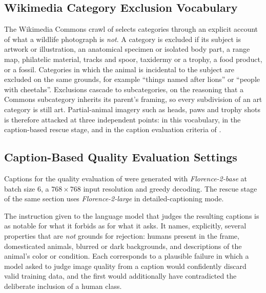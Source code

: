 \subsection{Wikimedia Category Exclusion Vocabulary}\label{sec:appendix_wikimedia_vocabulary}

The Wikimedia Commons crawl of  selects categories through an explicit account of what a wildlife photograph is \emph{not}. A category is excluded if its subject is artwork or illustration, an anatomical specimen or isolated body part, a range map, philatelic material, tracks and spoor, taxidermy or a trophy, a food product, or a fossil. Categories in which the animal is incidental to the subject are excluded on the same grounds, for example \enquote{things named after lions} or \enquote{people with cheetahs}. Exclusions cascade to subcategories, on the reasoning that a Commons subcategory inherits its parent's framing, so every subdivision of an art category is still art. Partial-animal imagery such as heads, paws and trophy shots is therefore attacked at three independent points: in this vocabulary, in the caption-based rescue stage, and in the caption evaluation criteria of .

\subsection{Caption-Based Quality Evaluation Settings}\label{sec:appendix_caption_settings}

Captions for the quality evaluation of  were generated with \textit{Florence-2-base} at batch size $6$, a $768\times768$ input resolution and greedy decoding. The rescue stage of the same section uses \textit{Florence-2-large} in detailed-captioning mode.

The instruction given to the language model that judges the resulting captions is as notable for what it forbids as for what it asks. It names, explicitly, several properties that are \emph{not} grounds for rejection: humans present in the frame, domesticated animals, blurred or dark backgrounds, and descriptions of the animal's color or condition. Each corresponds to a plausible failure in which a model asked to judge image quality from a caption would confidently discard valid training data, and the first would additionally have contradicted the deliberate inclusion of a human class.

